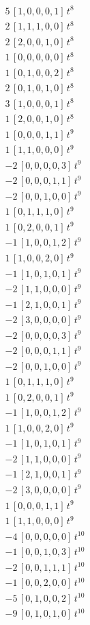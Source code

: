 \begin{align*}
5\,[1,0,0,0,1]\,t^{8} \\
2\,[1,1,1,0,0]\,t^{8} \\
2\,[2,0,0,1,0]\,t^{8} \\
1\,[0,0,0,0,0]\,t^{8} \\
1\,[0,1,0,0,2]\,t^{8} \\
2\,[0,1,0,1,0]\,t^{8} \\
3\,[1,0,0,0,1]\,t^{8} \\
1\,[2,0,0,1,0]\,t^{8} \\
1\,[0,0,0,1,1]\,t^{9} \\
1\,[1,1,0,0,0]\,t^{9} \\
-2\,[0,0,0,0,3]\,t^{9} \\
-2\,[0,0,0,1,1]\,t^{9} \\
-2\,[0,0,1,0,0]\,t^{9} \\
1\,[0,1,1,1,0]\,t^{9} \\
1\,[0,2,0,0,1]\,t^{9} \\
-1\,[1,0,0,1,2]\,t^{9} \\
1\,[1,0,0,2,0]\,t^{9} \\
-1\,[1,0,1,0,1]\,t^{9} \\
-2\,[1,1,0,0,0]\,t^{9} \\
-1\,[2,1,0,0,1]\,t^{9} \\
-2\,[3,0,0,0,0]\,t^{9} \\
-2\,[0,0,0,0,3]\,t^{9} \\
-2\,[0,0,0,1,1]\,t^{9} \\
-2\,[0,0,1,0,0]\,t^{9} \\
1\,[0,1,1,1,0]\,t^{9} \\
1\,[0,2,0,0,1]\,t^{9} \\
-1\,[1,0,0,1,2]\,t^{9} \\
1\,[1,0,0,2,0]\,t^{9} \\
-1\,[1,0,1,0,1]\,t^{9} \\
-2\,[1,1,0,0,0]\,t^{9} \\
-1\,[2,1,0,0,1]\,t^{9} \\
-2\,[3,0,0,0,0]\,t^{9} \\
1\,[0,0,0,1,1]\,t^{9} \\
1\,[1,1,0,0,0]\,t^{9} \\
-4\,[0,0,0,0,0]\,t^{10} \\
-1\,[0,0,1,0,3]\,t^{10} \\
-2\,[0,0,1,1,1]\,t^{10} \\
-1\,[0,0,2,0,0]\,t^{10} \\
-5\,[0,1,0,0,2]\,t^{10} \\
-9\,[0,1,0,1,0]\,t^{10} \\

\end{align*}

